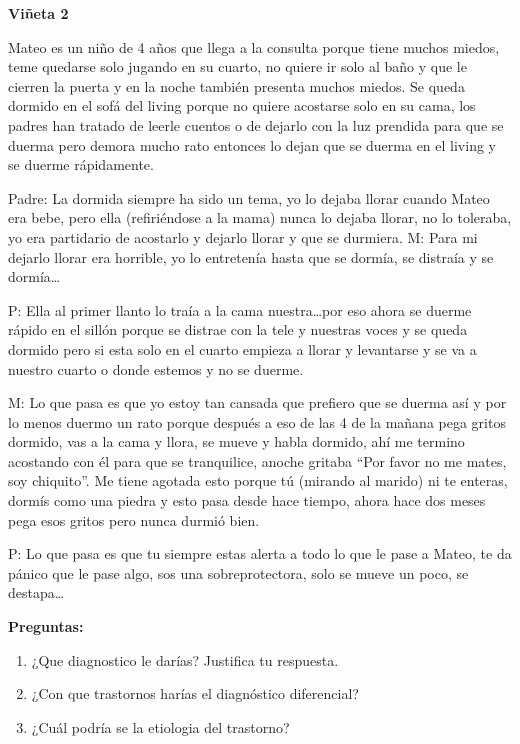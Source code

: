 \documentclass[12pt,a4paper]{article}
\begin{document}
\begin{shaded}
\textbf{Viñeta 2}

Mateo es un niño de 4 años que llega a la consulta porque tiene muchos
miedos, teme quedarse solo jugando en su cuarto, no quiere ir solo al baño y
que le cierren la puerta y en la noche también presenta muchos miedos. Se
queda dormido en el sofá del living porque no quiere acostarse solo en su
cama, los padres han tratado de leerle cuentos o de dejarlo con la luz prendida
para que se duerma pero demora mucho rato entonces lo dejan que se duerma
en el living y se duerme rápidamente.

Padre: La dormida siempre ha sido un tema, yo lo dejaba llorar cuando Mateo
era bebe, pero ella (refiriéndose a la mama) nunca lo dejaba llorar, no lo
toleraba, yo era partidario de acostarlo y dejarlo llorar y que se durmiera.
M: Para mi dejarlo llorar era horrible, yo lo entretenía hasta que se dormía, se
distraía y se dormía…

P: Ella al primer llanto lo traía a la cama nuestra…por eso ahora se duerme
rápido en el sillón porque se distrae con la tele y nuestras voces y se queda
dormido pero si esta solo en el cuarto empieza a llorar y levantarse y se va a
nuestro cuarto o donde estemos y no se duerme.

M: Lo que pasa es que yo estoy tan cansada que prefiero que se duerma así y
por lo menos duermo un rato porque después a eso de las 4 de la mañana
pega gritos dormido, vas a la cama y llora, se mueve y habla dormido, ahí me
termino acostando con él para que se tranquilice, anoche gritaba “Por favor no
me mates, soy chiquito”. Me tiene agotada esto porque tú (mirando al marido)
ni te enteras, dormís como una piedra y esto pasa desde hace tiempo, ahora
hace dos meses pega esos gritos pero nunca durmió bien.

P: Lo que pasa es que tu siempre estas alerta a todo lo que le pase a Mateo, te
da pánico que le pase algo, sos una sobreprotectora, solo se mueve un poco,
se destapa\ldots
\end{shaded}

\vspace{1cm}

\textbf{Preguntas:}

\begin{enumerate}
	\item ¿Que diagnostico le darías? Justifica tu respuesta.
	\item ¿Con que trastornos harías el diagnóstico diferencial?
	\item ¿Cuál podría se la etiologia del trastorno?
\end{enumerate}
\end{document}
